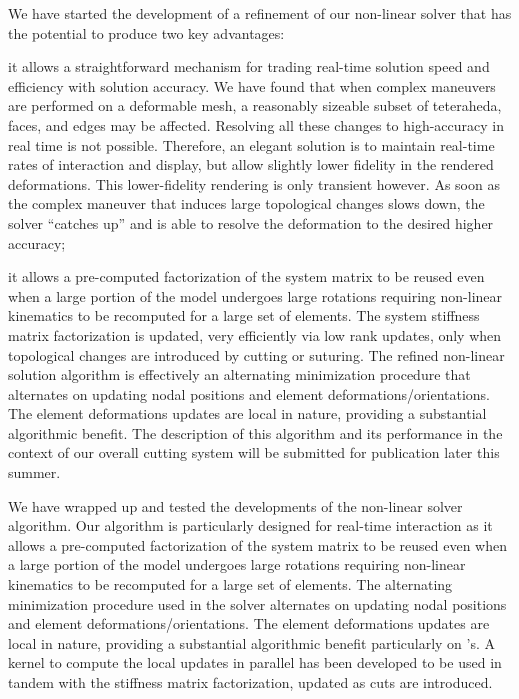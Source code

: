 We have started the development of a refinement of our non-linear solver that has the potential to produce two key advantages:
\begin{enumerate*}[(1)]
  \item it allows a straightforward mechanism for trading real-time solution speed and efficiency with solution accuracy.  We have found that when complex maneuvers are performed on a deformable mesh, a reasonably sizeable subset of teteraheda, faces, and edges may be affected. Resolving all these changes to high-accuracy in real time is not possible. Therefore, an elegant solution is to maintain real-time rates of interaction and display, but allow slightly lower fidelity in the rendered deformations.  This lower-fidelity rendering is only transient however. As soon as the complex maneuver that induces large topological changes slows down, the solver \enquote{catches up} and is able to resolve the deformation to the desired higher accuracy;
  \item it allows a pre-computed factorization of the system matrix to be reused even when a large portion of the model undergoes large rotations requiring non-linear kinematics to be recomputed for a large set of elements. The system stiffness matrix factorization is updated, very efficiently via low rank updates, only when topological changes are introduced by cutting or suturing.  The refined non-linear solution algorithm is effectively an alternating minimization procedure that alternates on updating nodal positions and element deformations/orientations. The element deformations updates are local in nature, providing a substantial algorithmic benefit. The description of this algorithm and its performance in the context of our overall cutting system will be submitted for publication later this summer.
\end{enumerate*}

We have wrapped up and tested the developments of the non-linear solver algorithm. Our algorithm is particularly designed for real-time interaction as it allows a pre-computed factorization of the system matrix to be reused even when a large portion of the model undergoes large rotations requiring non-linear kinematics to be recomputed for a large set of elements. The alternating minimization procedure used in the solver alternates on updating nodal positions and element deformations/orientations. The element deformations updates are local in nature, providing a substantial algorithmic benefit particularly on 's. A  kernel to compute the local updates in parallel has been developed to be used in tandem with the stiffness matrix factorization, updated as cuts are introduced.

